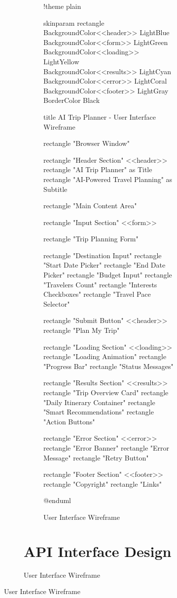 \documentclass[12pt,a4paper]{report}
\begin{document}
\begin{figure}[H]
\begin{plantuml}
\begin{figure}[H]
\begin{plantuml}
\begin{figure}[H]
\begin{plantuml}
!theme plain

skinparam rectangle {
    BackgroundColor<<header>> LightBlue
    BackgroundColor<<form>> LightGreen
    BackgroundColor<<loading>> LightYellow
    BackgroundColor<<results>> LightCyan
    BackgroundColor<<error>> LightCoral
    BackgroundColor<<footer>> LightGray
    BorderColor Black
}

title AI Trip Planner - User Interface Wireframe

rectangle "Browser Window" {
    rectangle "Header Section" <<header>> {
        rectangle "AI Trip Planner" as Title
        rectangle "AI-Powered Travel Planning" as Subtitle
    }
    
    rectangle "Main Content Area" {
        rectangle "Input Section" <<form>> {
            rectangle "Trip Planning Form" {
                rectangle "Destination Input"
                rectangle "Start Date Picker"
                rectangle "End Date Picker"
                rectangle "Budget Input"
                rectangle "Travelers Count"
                rectangle "Interests Checkboxes"
                rectangle "Travel Pace Selector"
                
                rectangle "Submit Button" <<header>> {
                    rectangle "Plan My Trip"
                }
            }
        }
        
        rectangle "Loading Section" <<loading>> {
            rectangle "Loading Animation"
            rectangle "Progress Bar"
            rectangle "Status Messages"
        }
        
        rectangle "Results Section" <<results>> {
            rectangle "Trip Overview Card"
            rectangle "Daily Itinerary Container"
            rectangle "Smart Recommendations"
            rectangle "Action Buttons"
        }
        
        rectangle "Error Section" <<error>> {
            rectangle "Error Banner"
            rectangle "Error Message"
            rectangle "Retry Button"
        }
    }
    
    rectangle "Footer Section" <<footer>> {
        rectangle "Copyright"
        rectangle "Links"
    }
}

@enduml
    \end{plantuml}
    \caption{User Interface Wireframe}
    \label{fig:ui-wireframe}
\end{figure}

\section{API Interface Design}


\end{plantuml}
\end{figure}
\end{plantuml}
\end{figure}
\end{document}
